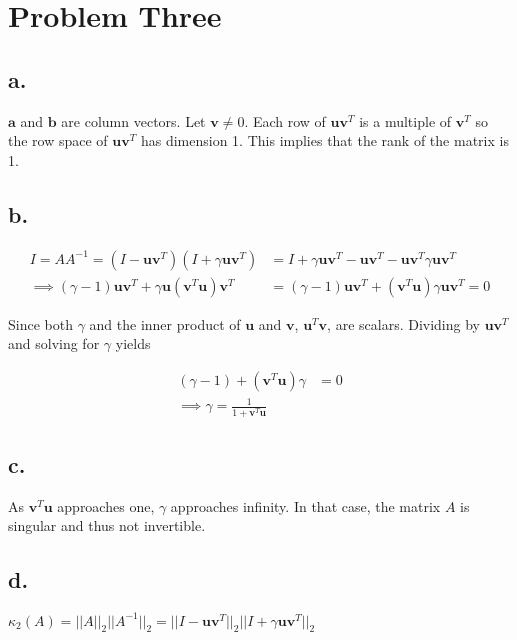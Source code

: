 \documentclass[00-main.tex]{subfiles}
\begin{document}
\section*{Problem Three}

\subsection*{a.}
$\mathbf{a}$ and $\mathbf{b}$ are column vectors. Let $\mathbf{v} \neq 0$. Each row of $\mathbf{uv}^T$ is a multiple of $\mathbf{v}^T$ so the row space of $\mathbf{uv}^T$ has dimension 1. This implies that the rank of the matrix is 1.

\subsection*{b.}

\begin{align}
\nonumber
I = AA^{-1} = (I-\mathbf{uv}^T)(I+\gamma \mathbf{uv}^T) &= I + \gamma \mathbf{uv}^T - \mathbf{uv}^T - \mathbf{uv}^T \gamma \mathbf{uv}^T \\
\implies
( \gamma - 1) \mathbf{uv}^T + \gamma \mathbf{u} ( \mathbf{v}^T \mathbf{u}) \mathbf{v}^T &= 
( \gamma - 1) \mathbf{uv}^T + ( \mathbf{v}^T \mathbf{u}) \gamma \mathbf{u} \mathbf{v}^T
= 0
\end{align}

Since both $\gamma$ and the inner product of $\mathbf{u}$ and $\mathbf{v}$, $\mathbf{u}^T \mathbf{v}$, are scalars. Dividing by $\mathbf{uv}^T$ and solving for $\gamma$ yields

\begin{align}
\nonumber
( \gamma - 1) + ( \mathbf{v}^T \mathbf{u}) \gamma &= 0 \\
\implies
\gamma = \frac{1}{1+ \mathbf{v}^T \mathbf{u}}
\end{align}

\subsection*{c.}
As $\mathbf{v}^T \mathbf{u}$ approaches one, $\gamma$ approaches infinity. In that case, the matrix $A$ is singular and thus not invertible.

\subsection*{d.}
$\kappa_2(A) = ||A||_2 ||A^{-1}||_2 = ||I-\mathbf{uv}^T||_2 ||I+\gamma \mathbf{uv}^T||_2 $
\end{document}
